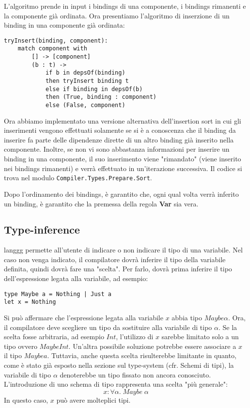 \documentclass[10pt,a4paper]{article}
\begin{document}
L'algoritmo prende in input i bindings di una componente, i bindings rimanenti e la componente già ordinata. Ora
presentiamo l'algoritmo di inserzione di un binding in una componente già ordinata:
\begin{lstlisting}
tryInsert(binding, component):
    match component with
        [] -> [component]
        (b : t) ->
            if b in depsOf(binding)
            then tryInsert binding t
            else if binding in depsOf(b)
            then (True, binding : component)
            else (False, component)
\end{lstlisting}
Ora abbiamo implementato una versione alternativa dell'insertion sort in cui gli inserimenti vengono effettuati
solamente se si è a conoscenza che il binding da inserire fa parte delle dipendenze dirette di un altro binding già
inserito nella componente. Inoltre, se non vi sono abbastanza informazioni per inserire un binding in una componente,
il suo inserimento viene "rimandato" (viene inserito nei bindings rimanenti) e verrà effettuato in un'iterazione
successiva. Il codice si trova nel modulo \texttt{Compiler.Types.Prepare.Sort}.

Dopo l'ordinamento dei bindings, è garantito che, ogni qual volta verrà inferito un binding, è garantito che la premessa
della regola \textbf{Var} sia vera.

\subsection{Type-inference}
langgg permette all'utente di indicare o non indicare il tipo di una variabile. Nel caso non venga indicato, il
compilatore dovrà inferire il tipo della variabile definita, quindi dovrà fare una "scelta". Per farlo, dovrà prima
inferire il tipo dell'espressione legata alla variabile, ad esempio:
\begin{lstlisting}
type Maybe a = Nothing | Just a
let x = Nothing
\end{lstlisting}
Si può affermare che l'espressione legata alla variabile $ x $ abbia tipo $ Maybe \alpha $. Ora, il compilatore
deve scegliere un tipo da sostituire alla variabile di tipo $ \alpha $. Se la scelta fosse arbitraria, ad esempio
$ Int $, l'utilizzo di $ x $ sarebbe limitato solo a un tipo ovvero $ Maybe Int $. Un'altra possibile soluzione
potrebbe essere associare a $ x $ il tipo $ Maybe a $. Tuttavia, anche questa scelta risulterebbe limitante in quanto,
come è stato già esposto nella sezione sul type-system (cfr. Schemi di tipi), la variabile di tipo $ \alpha $
denoterebbe un tipo fissato non ancora conosciuto. L'introduzione di uno schema di tipo rappresenta una scelta
"più generale":
\[ x : \forall \alpha. \; Maybe \; \alpha \]
In questo caso, $ x $ può avere molteplici tipi.
\end{document}
